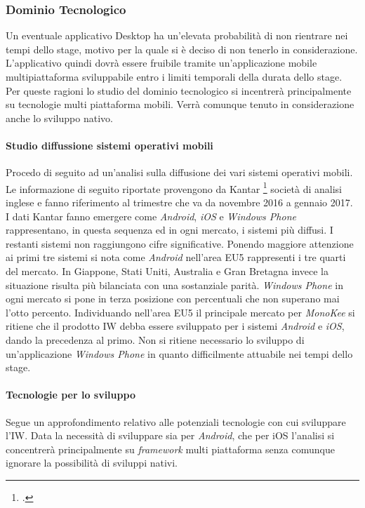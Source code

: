 \subsubsection{Dominio Tecnologico}
Un eventuale applicativo Desktop ha un’elevata probabilità di non rientrare nei tempi dello stage, motivo per la quale si è deciso di non tenerlo in considerazione. L’applicativo quindi dovrà essere fruibile tramite un’applicazione mobile multipiattaforma sviluppabile entro i limiti temporali della durata dello stage. 
Per queste ragioni lo studio del dominio tecnologico si incentrerà principalmente su tecnologie multi piattaforma mobili. Verrà comunque tenuto in considerazione anche lo sviluppo nativo.
\paragraph{Studio diffussione sistemi operativi mobili}
Procedo di seguito ad un’analisi sulla diffusione dei vari sistemi operativi mobili.
Le informazione di seguito riportate provengono da Kantar \footcite{site:kantar-study} società di analisi inglese e fanno riferimento al trimestre che va da novembre 2016 a gennaio 2017.
I dati Kantar fanno emergere come \emph{Android}, \emph{iOS} e \emph{Windows Phone} rappresentano, in questa sequenza ed in ogni mercato, i sistemi più diffusi. I restanti sistemi non raggiungono cifre significative. Ponendo maggiore attenzione ai primi tre sistemi si nota come \emph{Android} nell’area EU5 rappresenti i tre quarti del mercato. In Giappone, Stati Uniti, Australia e Gran Bretagna invece la situazione risulta più bilanciata con una sostanziale parità. \emph{Windows Phone} in ogni mercato si pone in terza posizione con percentuali che non superano mai l’otto percento. Individuando nell’area EU5 il principale mercato per \emph{MonoKee} si ritiene che il prodotto IW debba essere sviluppato per i sistemi \emph{Android} e \emph{iOS}, dando la precedenza al primo. Non si ritiene necessario lo sviluppo di un’applicazione \emph{Windows Phone} in quanto difficilmente attuabile nei tempi dello stage. 
\paragraph{Tecnologie per lo sviluppo}
Segue un approfondimento relativo alle potenziali tecnologie con cui sviluppare l’IW. Data la necessità di sviluppare sia per \emph{Android}, che per {iOS} l’analisi si concentrerà principalmente su \emph{framework} multi piattaforma senza comunque ignorare la possibilità di sviluppi nativi.
